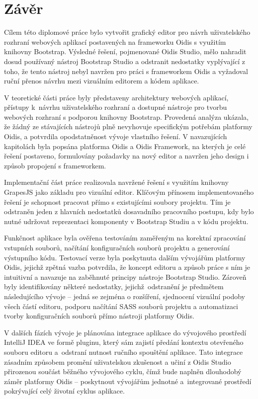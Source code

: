 \chapter{Závěr}
\label{Zaver}

Cílem této diplomové práce bylo vytvořit grafický editor pro návrh uživatelského rozhraní webových aplikací postavených na frameworku Oidis s využitím knihovny Bootstrap. Výsledné řešení, pojmenované Oidis Studio, mělo nahradit dosud používaný nástroj Bootstrap Studio a odstranit nedostatky vyplývající z toho, že tento nástroj nebyl navržen pro práci s frameworkem Oidis a vyžadoval ruční přenos návrhu mezi vizuálním editorem a kódem aplikace.

V teoretické části práce byly představeny architektury webových 
aplikací, přístupy k~návrhu uživatelského rozhraní a dostupné nástroje pro tvorbu webových rozhraní s podporou knihovny Bootstrap. Provedená analýza ukázala, že žádný ze stávajících nástrojů plně nevyhovuje specifickým potřebám 
platformy Oidis, a potvrdila opodstatněnost vývoje vlastního řešení. V navazujících kapitolách byla popsána platforma Oidis a Oidis Framework, na kterých je celé řešení postaveno, formulovány požadavky na nový editor a navržen jeho design i způsob propojení s frameworkem.

Implementační část práce realizovala navržené řešení s využitím knihovny GrapesJS jako základu pro vizuální editor. Klíčovým přínosem implementovaného řešení je schopnost pracovat přímo s existujícími soubory projektu. Tím je odstraněn jeden z hlavních nedostatků dosavadního pracovního postupu, kdy bylo nutné udržovat reprezentaci komponenty v Bootstrap Studiu a v kódu projektu.

Funkčnost aplikace byla ověřena testováním zaměřeným na korektní zpracování vstupních souborů, načítání konfiguračních souborů projektu a generování výstupního kódu. Testovací verze byla poskytnuta dalším vývojářům platformy Oidis, jejichž zpětná vazba potvrdila, že koncept editoru a způsob práce s ním je intuitivní a navazuje na zaběhnuté principy nástroje Bootstrap Studio. 
Zároveň byly identifikovány některé nedostatky, jejichž~odstranění je předmětem následujícího vývoje -- jedná se zejména o rozšíření, sjednocení vizuální podoby všech částí editoru, podporu načítání SASS souborů projektu a automatizaci tvorby konfiguračních souborů přímo nástroji platformy Oidis.

V dalších fázích vývoje je plánována integrace aplikace do vývojového prostředí IntelliJ IDEA ve formě pluginu, který sám zajistí předání kontextu otevřeného souboru editoru a~odstraní nutnost ručního spouštění aplikace. Tato integrace zásadním způsobem promění uživatelskou zkušenost a učiní z Oidis Studio přirozenou součást běžného vývojového cyklu, čímž bude naplněn dlouhodobý záměr platformy Oidis -- poskytnout vývojářům jednotné a~integrované prostředí pokrývající celý životní cyklus aplikace.

%
